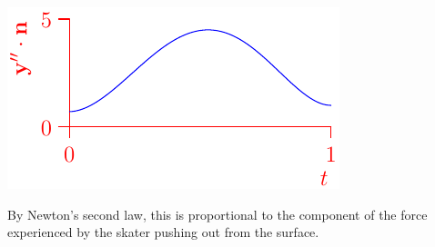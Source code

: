 \begin{example}{}{}
\begin{minipage}[t]{0.39\linewidth}
		\flushright\includegraphics{fund-skater2}
	\end{minipage}\medbreak
	By Newton's second law, this is proportional to the component of the force experienced by the skater pushing out from the surface. 
\end{example}

\goodbreak


% 





